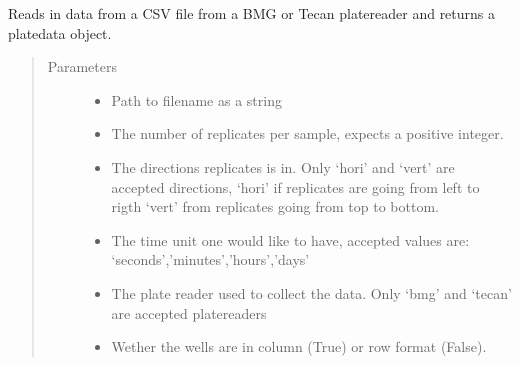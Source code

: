 \documentclass[letterpaper,10pt,english]{sphinxmanual}
\begin{document}

\begin{fulllineitems}
\label{\detokenize{platelib:platelib.plateread.read_plate}}
Reads in data from a CSV file from a BMG or Tecan platereader and returns a platedata object.
\begin{quote}\begin{description}
\item[{Parameters}] \leavevmode\begin{itemize}
\item {} 
 \textendash{} Path to filename as a string

\item {} 
 \textendash{} The number of replicates per sample, expects a positive integer.

\item {} 
 \textendash{} The directions replicates is in. Only ‘hori’ and ‘vert’ are accepted directions, ‘hori’ if replicates are going from left to rigth ‘vert’ from replicates going from top to bottom.

\item {} 
 \textendash{} The time unit one would like to have, accepted values are: ‘seconds’,’minutes’,’hours’,’days’

\item {} 
 \textendash{} The plate reader used to collect the data. Only ‘bmg’ and ‘tecan’ are accepted platereaders

\item {} 
 \textendash{} Wether the wells are in column (True) or row format (False).

\end{itemize}

\end{description}\end{quote}

\end{fulllineitems}
\end{document}
